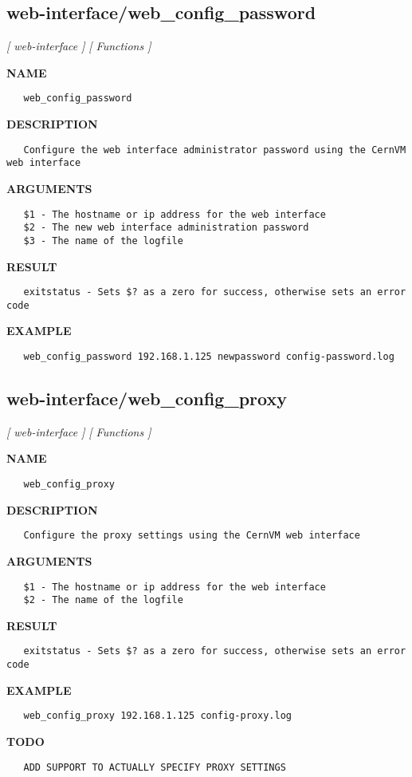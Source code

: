 \subsection{web-interface/web\_config\_password}
\textsl{[ web-interface ]}
\textsl{[ Functions ]}

\label{ch:robo50}
\label{ch:web_interface_web_config_password}
\textbf{NAME}
\begin{verbatim}
   web_config_password
\end{verbatim}
\textbf{DESCRIPTION}
\begin{verbatim}
   Configure the web interface administrator password using the CernVM web interface
\end{verbatim}
\textbf{ARGUMENTS}
\begin{verbatim}
   $1 - The hostname or ip address for the web interface
   $2 - The new web interface administration password
   $3 - The name of the logfile
\end{verbatim}
\textbf{RESULT}
\begin{verbatim}
   exitstatus - Sets $? as a zero for success, otherwise sets an error code
\end{verbatim}
\textbf{EXAMPLE}
\begin{verbatim}
   web_config_password 192.168.1.125 newpassword config-password.log
\end{verbatim}
\newpage
\subsection{web-interface/web\_config\_proxy}
\textsl{[ web-interface ]}
\textsl{[ Functions ]}

\label{ch:robo51}
\label{ch:web_interface_web_config_proxy}
\textbf{NAME}
\begin{verbatim}
   web_config_proxy
\end{verbatim}
\textbf{DESCRIPTION}
\begin{verbatim}
   Configure the proxy settings using the CernVM web interface
\end{verbatim}
\textbf{ARGUMENTS}
\begin{verbatim}
   $1 - The hostname or ip address for the web interface
   $2 - The name of the logfile
\end{verbatim}
\textbf{RESULT}
\begin{verbatim}
   exitstatus - Sets $? as a zero for success, otherwise sets an error code
\end{verbatim}
\textbf{EXAMPLE}
\begin{verbatim}
   web_config_proxy 192.168.1.125 config-proxy.log
\end{verbatim}
\textbf{TODO}
\begin{verbatim}
   ADD SUPPORT TO ACTUALLY SPECIFY PROXY SETTINGS
\end{verbatim}
\newpage
